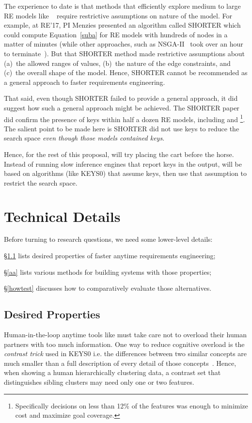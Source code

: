 The experience to date is that methods that efficiently explore medium to large
RE models like \   require
restrictive assumptions on nature
of the model. For example, at RE'17, PI Menzies presented an algorithm called SHORTER which could  compute Equation~\ref{suba}
for RE models with hundreds of nodes in a matter of minutes (while other approaches, such as NSGA-II~\cite{deb00a} took over an hour to terminate~\cite{mathew2017shorter}).
But that SHORTER method made restrictive assumptions about  (a)~the allowed ranges of values, (b)~the nature of the edge constraints, and (c)~the overall shape of the model.
Hence, SHORTER cannot be recommended as a general approach to faster requirements engineering.


That said, even though SHORTER  failed to provide a general approach,
it did suggest how such a general approach might be achieved. 
The SHORTER paper did   confirm the presence of keys within half a dozen
RE models, including  and \footnote{
Specifically   decisions on less than 12\%  of the features
was enough to minimize cost and maximize goal coverage.}.
The salient point  to be made here is  
SHORTER  did  not use keys to reduce
the search space {\em even though those models contained keys}.

Hence, for the rest of this proposal,
{\IT} will try placing the cart before the horse. Instead of running
slow inference engines that report keys in the output,
{\IT} will be based on algorithms (like KEYS0) that assume keys, then use that assumption
to restrict the search space.  


\section{ Technical Details}
\noindent
Before turning to research questions, we need some lower-level details:
\bi
\item \S\ref{desire} lists  desired properties of faster anytime requirements engineering;
\item \S\ref{aa} lists  various methods for building systems with those properties;
\item \S\ref{howtest} discusses how to comparatively evaluate those alternatives.
\ei

\subsection{Desired Properties}\label{desire}

Human-in-the-loop anytime tools like {\IT}
 must take care not to
 overload their human partners with too much information. 
 One way to reduce cognitive overload
 is   the {\em contrast trick} used in KEYS0 i.e. the differences between two similar
 concepts are much smaller than a full description of every detail of
 those concepts~\cite{borges2012learning,kelly1969clinical}. Hence, when showing a human 
 hierarchically clustering data, a contrast
 set that distinguishes sibling clusters may need only one or two features.
  
